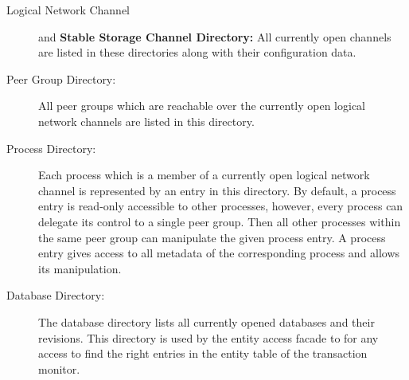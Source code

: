 \documentclass[a4paper, 10pt]{book}
\begin{document}
                                \begin{description}
                                    \item[Logical Network Channel] and \textbf{Stable Storage Channel Directory:}
                                        All currently open channels are listed in these directories along
                                        with their configuration data. 
                                    \item[Peer Group Directory:] All peer groups which are reachable over
                                        the currently open logical network channels are listed in this
                                        directory.
                                    \item[Process Directory:] Each process which is a member of a
                                        currently open logical network channel is represented by an entry in
                                        this directory. By default, a process entry is read-only accessible
                                        to other processes, however, every process can delegate its control
                                        to a single peer group. Then all other processes within the same
                                        peer group can manipulate the given process entry. A process entry
                                        gives access to all metadata of the corresponding process and allows
                                        its manipulation.
                                    \item[Database Directory:] The database directory lists all currently
                                        opened databases and their revisions. This directory is used by the
                                        entity access facade to for any access to find the right entries in
                                        the entity table of the transaction monitor. 
                                \end{description}
\end{document}
